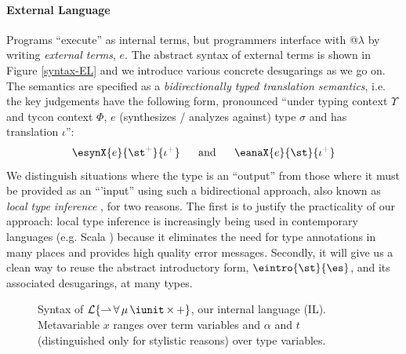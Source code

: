 \paragraph{External Language} Programs ``execute'' as internal terms, but programmers interface with @$\lambda$ by writing \emph{external terms}, $e$. The abstract syntax of external terms is shown in Figure \ref{syntax-EL} and we introduce various concrete desugarings as we go on. %
The semantics are specified as a \emph{bidirectionally typed translation semantics}, i.e. the key judgements have the following form, pronounced ``under typing context $\Upsilon$ and tycon context $\Phi$, $e$ (synthesizes / analyzes against) type $\sigma$ and has  translation $\iota$'':\[\esynX{e}{\st\moutput}{\iota\moutput} ~~~~~\text{and}~~~~~ \eanaX{e}{\st}{\iota\moutput}\]
\noindent
We distinguish situations where the type is an ``output'' from those where it must be provided as an ``'input'' using such a bidirectional approach, also known as \emph{local type inference} \cite{Pierce:2000:LTI:345099.345100}, for two reasons. The first is to justify the practicality of our approach: local type inference is increasingly being used in contemporary languages (e.g. Scala \cite{OdeZenZen01}) because it eliminates the need for type annotations in many places and provides high quality error messages. %
Secondly, it will  give us a clean way to reuse the abstract introductory form, $\eintro{\st}{\es}$, and its associated desugarings, at many types.%


\begin{figure}[t]
\small
\hspace{-5px}
\caption{Syntax of {$\mathcal{L}\{{\rightharpoonup}\,{\forall}\,{\mu}\,{\iunit}\,{\times}\,{+}\}$}, our internal language (IL). Metavariable $x$ ranges over term variables and $\alpha$ and $t$ (distinguished only for stylistic reasons) over type variables.}
\label{syntax-IL}
\end{figure}

